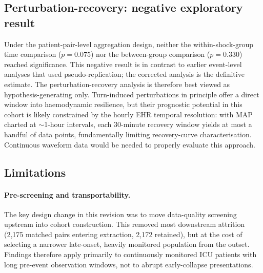 \documentclass[referee,lineno,pdflatex]{sn-article-template/sn-jnl}
\begin{document}
\subsection{Perturbation-recovery: negative exploratory result}

Under the patient-pair-level aggregation design, neither the
within-shock-group time comparison ($p = 0.075$) nor the between-group comparison
($p = 0.330$) reached significance.
This negative result is in contrast to earlier event-level analyses that used
pseudo-replication; the corrected analysis is the definitive estimate.
The perturbation-recovery analysis is therefore best viewed as hypothesis-generating only.
Turn-induced perturbations in principle offer a direct window into haemodynamic resilience,
but their prognostic potential in this cohort is likely constrained by the hourly EHR
temporal resolution: with MAP charted at $\sim$1-hour intervals, each 30-minute recovery
window yields at most a handful of data points, fundamentally limiting recovery-curve
characterisation.
Continuous waveform data would be needed to properly evaluate this approach.

\subsection{Limitations}
\label{sec:limits}

\paragraph{Pre-screening and transportability.}
The key design change in this revision was to move data-quality screening upstream into
cohort construction.
This removed most downstream attrition (2,175 matched pairs entering extraction,
2,172 retained), but at the cost of selecting a narrower late-onset, heavily monitored
population from the outset.
Findings therefore apply primarily to continuously monitored ICU patients with long
pre-event observation windows, not to abrupt early-collapse presentations.
\end{document}

